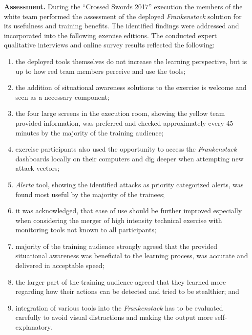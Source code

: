 \textbf{Assessment.}
During the ``Crossed Swords 2017'' execution the members of the white team performed the assessment of the deployed \textit{Frankenstack} solution for its usefulness and training benefits. The identified findings were addressed and incorporated into the following exercise editions. The conducted expert qualitative interviews and online survey results reflected the following:
\begin{enumerate}
    \item the deployed tools themselves do not increase the learning perspective, but is up to how red team members perceive and use the tools;
    \item the addition of situational awareness solutions to the exercise is welcome and seen as a necessary component;
    \item the four large screens in the execution room, showing the yellow team provided information, was preferred and checked approximately every 45 minutes by the majority of the training audience;
    \item exercise participants also used the opportunity to access the \textit{Frankenstack} dashboards locally on their computers and dig deeper when attempting new attack vectors;
    \item \textit{Alerta} tool, showing the identified attacks as priority categorized alerts, was found most useful by the majority of the trainees;
    \item it was acknowledged, that ease of use should be further improved especially when considering the merger of high intensity technical exercise with monitoring tools not known to all participants;
    \item majority of the training audience strongly agreed that the provided situational awareness was beneficial to the learning process, was accurate and delivered in acceptable speed;
    \item the larger part of the training audience agreed that they learned more regarding how their actions can be detected and tried to be stealthier; and
    \item integration of various tools into the \textit{Frankenstack} has to be evaluated carefully to avoid visual distractions and making the output more self-explanatory.
\end{enumerate}

